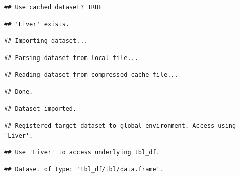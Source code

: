 \documentclass[
  11pt,
  a4paper,
]{scrartcl}
\begin{document}
\begin{verbatim}
## Use cached dataset? TRUE
\end{verbatim}

\begin{verbatim}
## 'Liver' exists.
\end{verbatim}

\begin{verbatim}
## Importing dataset...
\end{verbatim}

\begin{verbatim}
## Parsing dataset from local file...
\end{verbatim}

\begin{verbatim}
## Reading dataset from compressed cache file...
\end{verbatim}

\begin{verbatim}
## Done.
\end{verbatim}

\begin{verbatim}
## Dataset imported.
\end{verbatim}

\begin{verbatim}
## Registered target dataset to global environment. Access using 'Liver'.
\end{verbatim}

\begin{verbatim}
## Use 'Liver' to access underlying tbl_df.
\end{verbatim}

\begin{verbatim}
## Dataset of type: 'tbl_df/tbl/data.frame'.
\end{verbatim}
\end{document}
